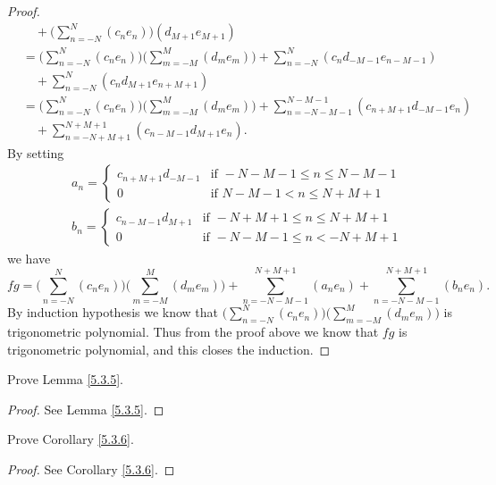 \begin{proof}
\begin{align*}
            & \quad + \bigg(\sum_{n = -N}^N (c_n e_n)\bigg) (d_{M + 1} e_{M + 1})                                                                              \\
            & = \bigg(\sum_{n = -N}^N (c_n e_n)\bigg) \bigg(\sum_{m = -M}^M (d_m e_m)\bigg) + \sum_{n = -N}^N (c_n d_{-M - 1} e_{n - M - 1})                   \\
            & \quad + \sum_{n = -N}^N (c_n d_{M + 1} e_{n + M + 1})                                                                                            \\
            & = \bigg(\sum_{n = -N}^N (c_n e_n)\bigg) \bigg(\sum_{m = -M}^M (d_m e_m)\bigg) + \sum_{n = -N - M - 1}^{N - M - 1} (c_{n + M + 1} d_{-M - 1} e_n) \\
            & \quad + \sum_{n = -N + M + 1}^{N + M + 1} (c_{n - M - 1} d_{M + 1} e_n).
    \end{align*}
    By setting
    \begin{align*}
         & a_n = \begin{cases}
            c_{n + M + 1} d_{-M - 1} & \text{if } -N - M - 1 \leq n \leq N - M - 1 \\
            0                        & \text{if } N - M - 1 < n \leq N + M + 1
        \end{cases} \\
         & b_n = \begin{cases}
            c_{n - M - 1} d_{M + 1} & \text{if } -N + M + 1 \leq n \leq N + M + 1 \\
            0                       & \text{if } -N - M - 1 \leq n < -N + M + 1
        \end{cases}
    \end{align*}
    we have
    \[
        fg = \bigg(\sum_{n = -N}^N (c_n e_n)\bigg) \bigg(\sum_{m = -M}^M (d_m e_m)\bigg) + \sum_{n = -N - M - 1}^{N + M + 1} (a_n e_n) + \sum_{n = -N - M - 1}^{N + M + 1} (b_n e_n).
    \]
    By induction hypothesis we know that \(\bigg(\sum_{n = -N}^N (c_n e_n)\bigg) \bigg(\sum_{m = -M}^M (d_m e_m)\bigg)\) is trigonometric polynomial.
    Thus from the proof above we know that \(fg\) is trigonometric polynomial, and this closes the induction.
\end{proof}

\begin{exercise}\label{ex 5.3.2}
    Prove Lemma \ref{5.3.5}.
\end{exercise}

\begin{proof}
    See Lemma \ref{5.3.5}.
\end{proof}

\begin{exercise}\label{ex 5.3.3}
    Prove Corollary \ref{5.3.6}.
\end{exercise}

\begin{proof}
    See Corollary \ref{5.3.6}.
\end{proof}